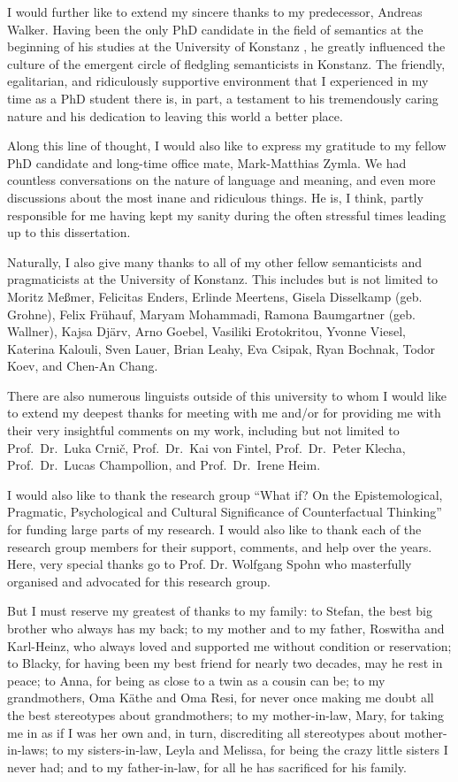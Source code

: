 I would further like to extend my sincere thanks to my predecessor, Andreas Walker. Having been the only PhD candidate in the field of semantics at the beginning of his studies at the University of Konstanz , he greatly influenced the culture of the emergent circle of fledgling semanticists in Konstanz. The friendly, egalitarian, and ridiculously supportive environment that I experienced in my time as a PhD student there is, in part, a testament to his tremendously caring nature and his dedication to leaving this world a better place.

Along this line of thought, I would also like to express my gratitude to my fellow PhD candidate and long-time office mate, Mark-Matthias Zymla. We had countless conversations on the nature of language and meaning, and even more discussions about the most inane and ridiculous things. He is, I think, partly responsible for me having kept my sanity during the often stressful times leading up to this dissertation.

Naturally, I also give many thanks to all of my other fellow semanticists and pragmaticists at the University of Konstanz. This includes but is not limited to Moritz Meßmer, Felicitas Enders, Erlinde Meertens, Gisela Disselkamp (geb. Grohne), Felix Frühauf, Maryam Mohammadi, Ramona Baumgartner (geb. Wallner), Kajsa Dj\"{a}rv, Arno Goebel, Vasiliki Erotokritou, Yvonne Viesel, Katerina Kalouli, Sven Lauer, Brian Leahy, Eva Csipak, Ryan Bochnak, Todor Koev, and Chen-An Chang.

There are also numerous linguists outside of this university to whom I would like to extend my deepest thanks for meeting with me and/or for providing me with their very insightful comments on my work, including but not limited to Prof.~Dr.~Luka Crni\v{c}, Prof.~Dr.~Kai von Fintel, Prof.~Dr.~Peter Klecha, Prof.~Dr.~Lucas Champollion, and Prof.~Dr.~Irene Heim.

I would also like to thank the research group \enquote{What if? On the Epistemological, Pragmatic, Psychological and Cultural Significance of Counterfactual Thinking} for funding large parts of my research. I would also like to thank each of the research group members for their support, comments, and help over the years. Here, very special thanks go to Prof. Dr. Wolfgang Spohn who masterfully organised and advocated for this research group.

But I must reserve my greatest of thanks to my family: to Stefan, the best big brother who always has my back; to my mother and to my father, Roswitha and Karl-Heinz, who always loved and supported me without condition or reservation; to Blacky, for having been my best friend for nearly two decades, may he rest in peace; to Anna, for being as close to a twin as a cousin can be; to my grandmothers, Oma K\"athe and Oma Resi, for never once making me doubt all the best stereotypes about grandmothers; to my mother-in-law, Mary, for taking me in as if I was her own and, in turn, discrediting all stereotypes about mother-in-laws; to my sisters-in-law, Leyla and Melissa, for being the crazy little sisters I never had; and to my father-in-law, for all he has sacrificed for his family.

